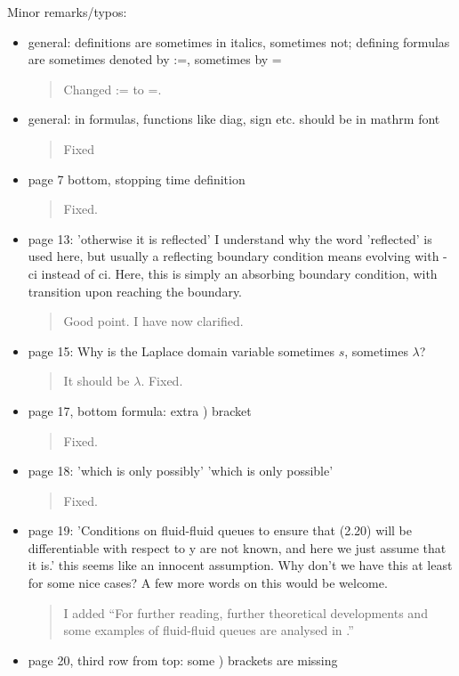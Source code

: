 \documentclass[a4paper]{article}
\begin{document}
Minor remarks/typos:
\begin{itemize}
\item general: definitions are sometimes in italics, sometimes not; defining formulas are
sometimes denoted by :=, sometimes by =
\begin{quote}
    Changed := to =. 
\end{quote}
\item {general: in formulas, functions like diag, sign etc. should be in mathrm font}
\begin{quote}
    Fixed
\end{quote}
\item page 7 bottom, stopping time definition
\begin{quote}
    Fixed. 
\end{quote}
\item {page 13: 'otherwise it is reflected' I understand why the word 'reflected' is used here, but usually a reflecting boundary condition means evolving with -ci instead of ci. Here, this is simply an absorbing boundary condition, with transition upon reaching the boundary.}
\begin{quote}
    Good point. I have now clarified.
\end{quote}
\item page 15: Why is the Laplace domain variable sometimes \(s\), sometimes \(\lambda\)?
\begin{quote}
   It should be \(\lambda\). Fixed.
\end{quote}
\item page 17, bottom formula: extra ) bracket
\begin{quote}
    Fixed. 
\end{quote}
\item {page 18: 'which is only possibly'  'which is only possible'}
\begin{quote}
    Fixed. 
\end{quote}
\item page 19: 'Conditions on fluid-fluid queues to ensure that (2.20) will be differentiable with respect to y are not known, and here we just assume that it is.' this seems like an innocent assumption. Why don't we have this at least for some nice cases? A few more words on this would be welcome.
\begin{quote}
    I added ``For further reading, further theoretical developments and some examples of fluid-fluid queues are analysed in \cite{boz2022}.''
\end{quote}
\item {page 20, third row from top: some ) brackets are missing}

\end{itemize}
\end{document}
